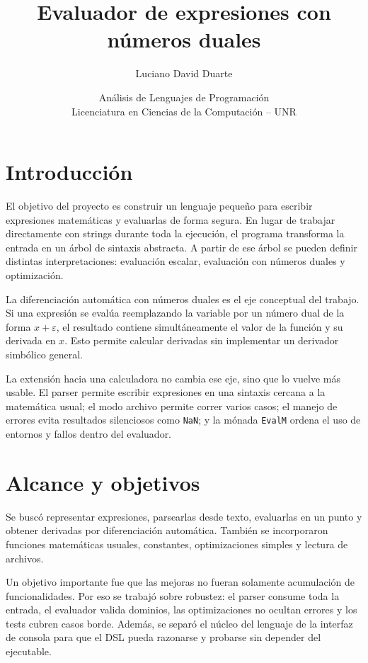 \documentclass[11pt,a4paper]{article}
\title{Evaluador de expresiones con números duales}
\author{Luciano David Duarte}
\date{Análisis de Lenguajes de Programación \\ Licenciatura en Ciencias de la Computación -- UNR}
\begin{document}
\maketitle

\section{Introducción}

El objetivo del proyecto es construir un lenguaje pequeño para escribir expresiones matemáticas y evaluarlas de forma segura. En lugar de trabajar directamente con strings durante toda la ejecución, el programa transforma la entrada en un árbol de sintaxis abstracta. A partir de ese árbol se pueden definir distintas interpretaciones: evaluación escalar, evaluación con números duales y optimización.

La diferenciación automática con números duales es el eje conceptual del trabajo. Si una expresión se evalúa reemplazando la variable por un número dual de la forma \(x + \varepsilon\), el resultado contiene simultáneamente el valor de la función y su derivada en \(x\). Esto permite calcular derivadas sin implementar un derivador simbólico general.

La extensión hacia una calculadora no cambia ese eje, sino que lo vuelve más usable. El parser permite escribir expresiones en una sintaxis cercana a la matemática usual; el modo archivo permite correr varios casos; el manejo de errores evita resultados silenciosos como \texttt{NaN}; y la mónada \texttt{EvalM} ordena el uso de entornos y fallos dentro del evaluador.

\section{Alcance y objetivos}

Se buscó representar expresiones, parsearlas desde texto, evaluarlas en un punto y obtener derivadas por diferenciación automática. También se incorporaron funciones matemáticas usuales, constantes, optimizaciones simples y lectura de archivos.

Un objetivo importante fue que las mejoras no fueran solamente acumulación de funcionalidades. Por eso se trabajó sobre robustez: el parser consume toda la entrada, el evaluador valida dominios, las optimizaciones no ocultan errores y los tests cubren casos borde. Además, se separó el núcleo del lenguaje de la interfaz de consola para que el DSL pueda razonarse y probarse sin depender del ejecutable.
\end{document}
